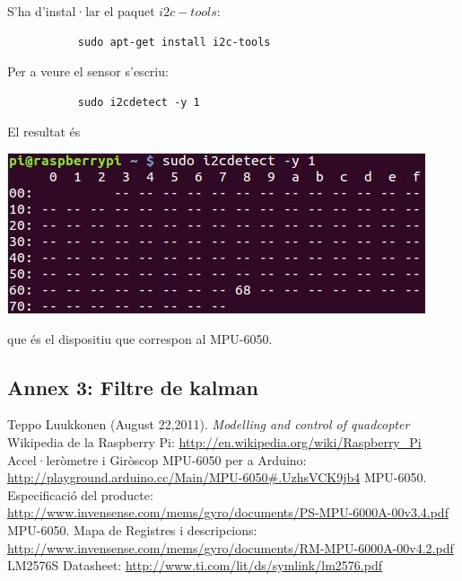 \documentclass[twoside]{article}
\begin{document}
S'ha d'instal·lar el paquet $i2c-tools$:
\begin{verbatim}
           sudo apt-get install i2c-tools
\end{verbatim}
Per a veure el sensor s'escriu:
\begin{verbatim}
           sudo i2cdetect -y 1
\end{verbatim}
El resultat és 
\begin{center}
\includegraphics[scale=0.7]{images/i2cdetect.jpg}
\end{center}
que és el dispositiu que correspon al MPU-6050.
\newpage
\subsection*{Annex 3: Filtre de kalman}

\newpage
\begin{thebibliography}{99}
 Teppo Luukkonen (August 22,2011). \textit{Modelling and control of quadcopter}
 Wikipedia de la Raspberry Pi: \url{http://en.wikipedia.org/wiki/Raspberry_Pi}
 Accel·leròmetre i Giròscop MPU-6050 per a Arduino: \url{http://playground.arduino.cc/Main/MPU-6050#.UzhsVCK9jb4}
 MPU-6050. Especificació del producte: \url{http://www.invensense.com/mems/gyro/documents/PS-MPU-6000A-00v3.4.pdf}
 MPU-6050. Mapa de Registres i descripcions: \url{http://www.invensense.com/mems/gyro/documents/RM-MPU-6000A-00v4.2.pdf}
 LM2576S Datasheet: \url{http://www.ti.com/lit/ds/symlink/lm2576.pdf}
\end{thebibliography}{}
\end{document}
